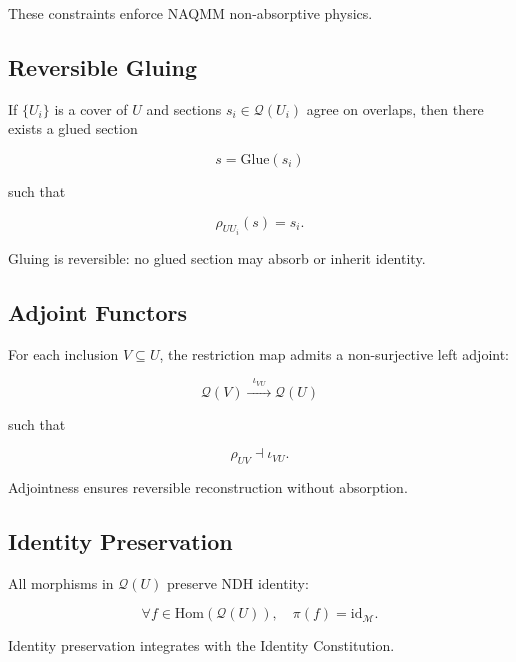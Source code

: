 These constraints enforce NAQMM non-absorptive physics.


\subsection{Reversible Gluing}

If $\{U_i\}$ is a cover of $U$ and sections $s_i \in \mathcal{Q}(U_i)$
agree on overlaps, then there exists a glued section

\[
s = \mathrm{Glue}(s_i)
\]

such that

\[
\rho_{U U_i}(s) = s_i.
\]

Gluing is reversible: no glued section may absorb or inherit identity.


\subsection{Adjoint Functors}

For each inclusion $V \subseteq U$, the restriction map admits a
non-surjective left adjoint:

\[
\mathcal{Q}(V) \xrightarrow{\;\;\iota_{VU}\;\;} \mathcal{Q}(U)
\]

such that

\[
\rho_{UV} \dashv \iota_{VU}.
\]

Adjointness ensures reversible reconstruction without absorption.


\subsection{Identity Preservation}

All morphisms in $\mathcal{Q}(U)$ preserve NDH identity:

\[
\forall f \in \mathrm{Hom}(\mathcal{Q}(U)),\quad
\pi(f) = \mathrm{id}_{\mathcal{M}}.
\]

Identity preservation integrates with the Identity Constitution.

